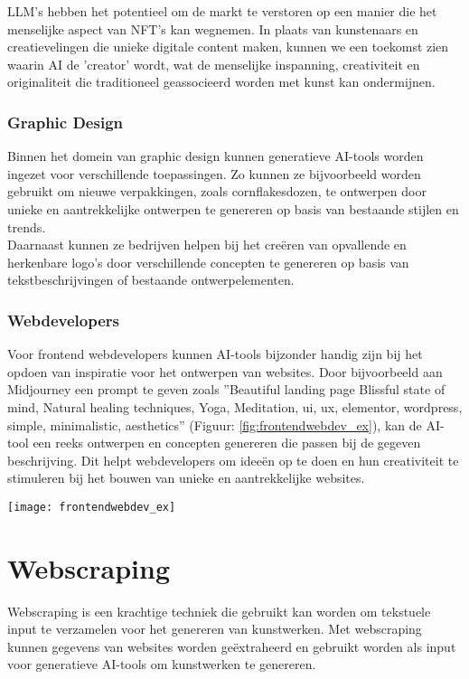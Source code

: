 LLM's hebben het potentieel om de markt te verstoren op een manier die het menselijke aspect van NFT's kan wegnemen. In plaats van kunstenaars en creatievelingen die unieke digitale content maken, kunnen we een toekomst zien waarin AI de 'creator' wordt, wat de menselijke inspanning, creativiteit en originaliteit die traditioneel geassocieerd worden met kunst kan ondermijnen. 

\subsubsection{Graphic Design}
Binnen het domein van graphic design kunnen generatieve AI-tools worden ingezet voor verschillende toepassingen. Zo kunnen ze bijvoorbeeld worden gebruikt om nieuwe verpakkingen, zoals cornflakesdozen, te ontwerpen door unieke en aantrekkelijke ontwerpen te genereren op basis van bestaande stijlen en trends.  \\

Daarnaast kunnen ze bedrijven helpen bij het creëren van opvallende en herkenbare logo's door verschillende concepten te genereren op basis van tekstbeschrijvingen of bestaande ontwerpelementen. 

\subsubsection{Webdevelopers}
Voor frontend webdevelopers kunnen AI-tools bijzonder handig zijn bij het opdoen van inspiratie voor het ontwerpen van websites. Door bijvoorbeeld aan Midjourney een prompt te geven zoals ''Beautiful landing page Blissful state of mind, Natural healing techniques, Yoga, Meditation, ui, ux, elementor, wordpress, simple, minimalistic, aesthetics'' (Figuur: \ref{fig:frontendwebdev_ex}), kan de AI-tool een reeks ontwerpen en concepten genereren die passen bij de gegeven beschrijving. Dit helpt webdevelopers om ideeën op te doen en hun creativiteit te stimuleren bij het bouwen van unieke en aantrekkelijke websites.

\begin{center}
    \texttt{[image: frontendwebdev\_ex]}
    \label{fig:frontendwebdev_ex}
\end{center}


\section{Webscraping}
\label{ch:liter_webscraping}
Webscraping is een krachtige techniek die gebruikt kan worden om tekstuele input te verzamelen voor het genereren van kunstwerken. Met webscraping kunnen gegevens van websites worden geëxtraheerd en gebruikt worden als input voor generatieve AI-tools om kunstwerken te genereren. \\
 
